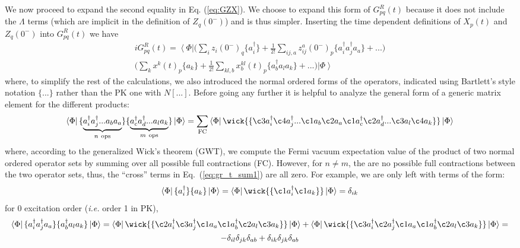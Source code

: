 \documentclass[aps,prb,preprint,groupaddress,floatfix]{revtex4}
\begin{document}
We now proceed to expand the second equality in Eq. (\ref{eq:GZX}). We choose to expand this form of $G^R_{pq}(t)$ because it does not include the $\Lambda$ terms (which are implicit in the definition of $Z_{q}(0^-)$) and is thus simpler. Inserting the time dependent definitions of $X_p(t)$ and $Z_q(0^-)$
into $G^R_{pq}(t)$ we have
\begin{multline}
\label{eq:gr_t_sum1}
iG^R_{pq}(t)=
\left< \Phi \right|
\bigl(\sum_i z_i(0^-)_q \{a^{\dagger}_i\} + 
\frac{1}{2!}\sum_{ij,a} z_{ij}^a(0^-)_p \{a^{\dagger}_i a^{\dagger}_j a_a\} + ...\bigr)\\
\bigl(\sum_k x^k(t)_p \{a_k\} +
\frac{1}{2!}\sum_{kl,b} x^{kl}_b(t)_p \{a^{\dagger}_b a_l a_k\} + ...\bigr)
\left| \Phi \right>
\end{multline}
where, to simplify the rest of the calculations, we also introduced the normal
ordered forms of the operators, indicated using Bartlett's style notation
$\{...\}$ rather than the PK one with $N[...]$. Before going any further it is helpful to analyze the general form of a generic matrix element for the different products:
\begin{equation}
\left< \Phi \right|
\{\underbrace{a^{\dagger}_i a^{\dagger}_j ... a_b a_a }_{n~\mathrm{ops}}\}
\{\underbrace{a^{\dagger}_c a^{\dagger}_d ... a_l a_k }_{m~\mathrm{ops}}\}
\left| \Phi \right> =
\sum_\mathrm{FC}
\left< \Phi \right|
\wick{
\{\c3 a^{\dagger}_i \c4 a^{\dagger}_j ... \c1 a_b \c2 a_a
  \c1 a^{\dagger}_c \c2 a^{\dagger}_d ... \c3 a_l \c4 a_k \}
}
\left| \Phi \right>
\end{equation}
where, according to the generalized Wick's theorem (GWT), we compute the Fermi
vacuum expectation value of the product of two normal ordered operator sets by
summing over all possible full contractions (FC). However, for $n \neq m$, the
are no possible full contractions between the two operator sets, thus, the
``cross'' terms in Eq.\ (\ref{eq:gr_t_sum1}) are all zero. For example, we are
only left with terms of the form:
\begin{equation}
\left< \Phi \right|
\{a^{\dagger}_i \} \{a_k \}
\left| \Phi \right> =
\left< \Phi \right|
\wick{
\{\c1 a^{\dagger}_i \c1 a_k \}
}
\left| \Phi \right> = \delta_{ik}
\end{equation}
for 0 excitation order (\textit{i.e.} order 1 in PK),
\begin{multline}
\left< \Phi \right|
\{a^{\dagger}_i a^{\dagger}_j a_a \}
\{a^{\dagger}_b a_l a_k \}
\left| \Phi \right> =
\left< \Phi \right|
\wick{
\{ \c2 a^{\dagger}_i \c3 a^{\dagger}_j \c1 a_a
   \c1 a^{\dagger}_b \c2 a_l \c3 a_k \}
}
\left| \Phi \right>
+
\left< \Phi \right|
\wick{
\{ \c3 a^{\dagger}_i \c2 a^{\dagger}_j \c1 a_a
   \c1 a^{\dagger}_b \c2 a_l \c3 a_k \}
}
\left| \Phi \right> = \\
- \delta_{il}\delta_{jk}\delta_{ab} + \delta_{ik}\delta_{jk}\delta_{ab}
\end{multline}
\end{document}
